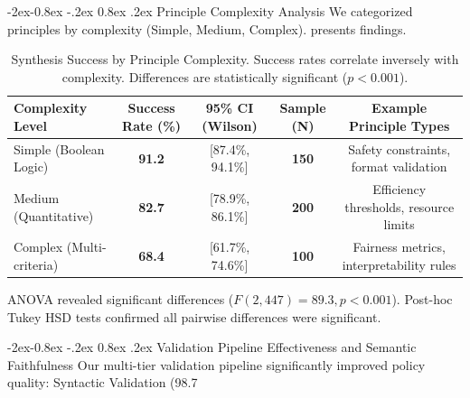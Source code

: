 \documentclass[manuscript,screen,9pt]{acmart}
\makeatletter
\renewcommand\subsubsection{\@startsection{subsubsection}{3}{\z@}%
  {-2ex\@plus -0.8ex \@minus -.2ex}%
  {0.8ex \@plus .2ex}%
  {\normalfont\normalsize\bfseries}}
\newcommand{\tablesize}{\footnotesize}
\newcommand{\tablenumfmt}[1]{\textbf{#1}}
\newcommand{\tableheader}[1]{\textbf{#1}}
\makeatother
\begin{document}
\subsubsection{Principle Complexity Analysis}
We categorized principles by complexity (Simple, Medium, Complex).  presents findings.
\begin{table}[htbp]
\centering
\caption{Synthesis Success by Principle Complexity. Success rates correlate inversely with complexity. Differences are statistically significant ($p < 0.001$).}
\label{tab:complexity_analysis}
\tablesize
\begin{tabular}{@{}lcccc@{}}
\toprule
\tableheader{Complexity Level} & \tableheader{Success Rate (\%)} & \tableheader{95\% CI (Wilson)} & \tableheader{Sample (N)} & \tableheader{Example Principle Types} \\
\midrule
Simple (Boolean Logic)    & \tablenumfmt{91.2} & [87.4\%, 94.1\%] & \tablenumfmt{150} & Safety constraints, format validation \\
Medium (Quantitative)   & \tablenumfmt{82.7} & [78.9\%, 86.1\%] & \tablenumfmt{200} & Efficiency thresholds, resource limits \\
Complex (Multi-criteria) & \tablenumfmt{68.4} & [61.7\%, 74.6\%] & \tablenumfmt{100} & Fairness metrics, interpretability rules \\
\bottomrule
\end{tabular}
\end{table}
ANOVA revealed significant differences ($F(2,447) = 89.3, p < 0.001$). Post-hoc Tukey HSD tests confirmed all pairwise differences were significant.

\subsubsection{Validation Pipeline Effectiveness and Semantic Faithfulness}
Our multi-tier validation pipeline significantly improved policy quality: Syntactic Validation (98.7%
\end{document}

